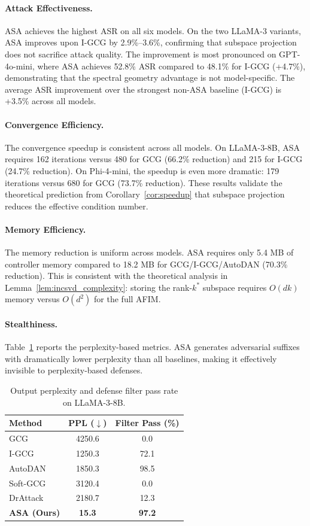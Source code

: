 ﻿\documentclass[lettersize,journal]{IEEEtran}
\begin{document}
\paragraph{Attack Effectiveness.} ASA achieves the highest ASR on all six models. On the two LLaMA-3 variants, ASA improves upon I-GCG by 2.9\%--3.6\%, confirming that subspace projection does not sacrifice attack quality. The improvement is most pronounced on GPT-4o-mini, where ASA achieves 52.8\% ASR compared to 48.1\% for I-GCG (+4.7\%), demonstrating that the spectral geometry advantage is not model-specific. The average ASR improvement over the strongest non-ASA baseline (I-GCG) is +3.5\% across all models.

\paragraph{Convergence Efficiency.} The convergence speedup is consistent across all models. On LLaMA-3-8B, ASA requires 162 iterations versus 480 for GCG (66.2\% reduction) and 215 for I-GCG (24.7\% reduction). On Phi-4-mini, the speedup is even more dramatic: 179 iterations versus 680 for GCG (73.7\% reduction). These results validate the theoretical prediction from Corollary~\ref{cor:speedup} that subspace projection reduces the effective condition number.

\paragraph{Memory Efficiency.} The memory reduction is uniform across models. ASA requires only 5.4 MB of controller memory compared to 18.2 MB for GCG/I-GCG/AutoDAN (70.3\% reduction). This is consistent with the theoretical analysis in Lemma~\ref{lem:incsvd_complexity}: storing the rank-$k^*$ subspace requires $O(dk)$ memory versus $O(d^2)$ for the full AFIM.

\paragraph{Stealthiness.} Table~\ref{tab:perplexity} reports the perplexity-based metrics. ASA generates adversarial suffixes with dramatically lower perplexity than all baselines, making it effectively invisible to perplexity-based defenses.

\begin{table}[t]
\centering
\caption{Output perplexity and defense filter pass rate on LLaMA-3-8B.}
\label{tab:perplexity}
\begin{tabular}{lcc}
\toprule
\textbf{Method} & \textbf{PPL ($\downarrow$)} & \textbf{Filter Pass (\%)} \\
\midrule
GCG & 4250.6 & 0.0 \\
I-GCG & 1250.3 & 72.1 \\
AutoDAN & 1850.3 & 98.5 \\
Soft-GCG & 3120.4 & 0.0 \\
DrAttack & 2180.7 & 12.3 \\
\rowcolor[gray]{0.9}
\textbf{ASA (Ours)} & \textbf{15.3} & \textbf{97.2} \\
\bottomrule
\end{tabular}
\end{table}
\end{document}
